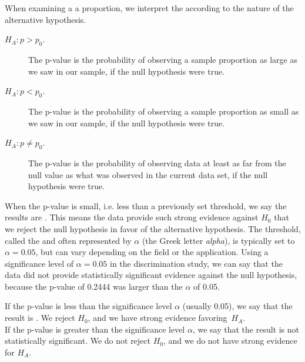 \begin{termBox}{
When examining a a proportion, we interpret the  according to the nature of the alternative hypothesis.
\begin{description}
\item[$H_A: p > p_0.$ ] The p-value is the probability of observing a sample proportion as large as we saw in our sample, if the null hypothesis were true.
\item[$H_A: p < p_0.$ ]The p-value is the probability of observing a sample proportion as small as we saw in our sample, if the null hypothesis were true.
\item[$H_A: p \ne p_0.$] The p-value is the probability of observing data at least as far from the null value as what was observed in the current data set, if the null hypothesis were true.
\end{description}}
\end{termBox}

When the p-value is small, i.e. less than a previously set threshold, we say the results are . This means the data provide such strong evidence against $H_0$ that we reject the null hypothesis in favor of the alternative hypothesis. The threshold, called the  and often represented by $\alpha$ (the Greek letter \emph{alpha}\label{alphadiscussion}), is typically set to $\alpha = 0.05$, but can vary depending on the field or the application. Using a significance level of $\alpha = 0.05$ in the discrimination study, we can say that the data did not provide statistically significant evidence against the null hypothesis, because the p-value of 0.2444 was larger than the $\alpha$ of 0.05.

\begin{termBox}{
If the p-value is less than the significance level $\alpha$ (usually 0.05), we say that the result is . We reject $H_0$, and we have strong evidence favoring~$H_A$. \\[2mm]
If the p-value is greater than the significance level $\alpha$, we say that the result is not statistically significant. We do not reject $H_0$, and we do not have strong evidence for $H_A$.}
\end{termBox}

